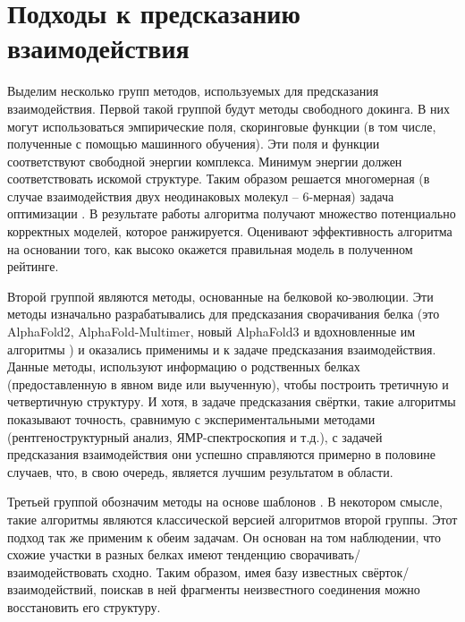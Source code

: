 \section{Подходы к предсказанию взаимодействия}
Выделим несколько групп методов, используемых для предсказания взаимодействия. Первой такой группой будут методы свободного докинга. В них могут использоваться эмпирические поля, скоринговые функции (в том числе, полученные с помощью машинного обучения). Эти поля и функции соответствуют свободной энергии комплекса. Минимум энергии должен соответствовать искомой структуре. Таким образом решается многомерная (в случае взаимодействия двух неодинаковых молекул – 6-мерная) задача оптимизации \cite{vreven}. В результате работы алгоритма получают множество потенциально корректных моделей, которое ранжируется. Оценивают эффективность алгоритма на основании того, как высоко окажется правильная модель в полученном рейтинге.

Второй группой являются методы, основанные на белковой ко-эволюции. Эти методы изначально разрабатывались для предсказания сворачивания белка (это AlphaFold2\cite{AF2}, AlphaFold-Multimer\cite{AFM}, новый AlphaFold3\cite{AF3} и вдохновленные им алгоритмы \cite{AF_followers}) и оказались применимы и к задаче предсказания взаимодействия. Данные методы, используют информацию о родственных белках (предоставленную в явном виде или выученную), чтобы построить третичную и четвертичную структуру. И хотя, в задаче предсказания свёртки, такие алгоритмы показывают точность, сравнимую с экспериментальными методами (рентгеноструктурный анализ, ЯМР-спектроскопия и т.д.), с задачей предсказания взаимодействия они успешно справляются примерно в половине случаев, что, в свою очередь, является лучшим результатом в области.

Третьей группой обозначим методы на основе шаблонов \cite{andras}. В некотором смысле, такие алгоритмы являются классической версией алгоритмов второй группы. Этот подход так же применим к обеим задачам. Он основан на том наблюдении, что схожие участки в разных белках имеют тенденцию сворачивать/взаимодействовать сходно. Таким образом, имея базу известных свёрток/взаимодействий, поискав в ней фрагменты неизвестного соединения можно восстановить его структуру.

